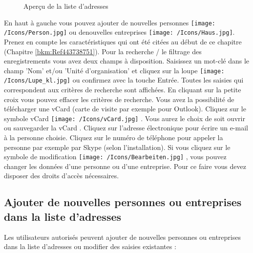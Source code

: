 \begin{figure}[H]
\caption{Aperçu de la liste d'adresses}
\end{figure}

En haut à gauche vous pouvez ajouter de nouvelles personnes \texttt{[image: /Icons/Person.jpg]} ou denouvelles entreprises \texttt{[image: /Icons/Haus.jpg]}. Prenez en compte les caractéristiques qui ont été citées au début de ce chapitre (Chapitre \ref{bkm:Ref443738751}). \newline
Pour la recherche / le filtrage des enregistrements vous avez deux champs à disposition. Saisissez un mot-clé dans le champ 'Nom' et/ou 'Unité d'organisation'  et cliquez sur la loupe \texttt{[image: /Icons/Lupe\_kl.jpg]}  ou confirmez avec la touche Entrée. Toutes les saisies qui correspondent aux critères de recherche sont affichées. En cliquant sur la petite croix  vous pouvez effacer les critères de recherche. \newline
Vous avez la possibilité de télécharger une vCard (carte de visite par exemple pour Outlook). Cliquez sur le symbole vCard \texttt{[image: /Icons/vCard.jpg]} . Vous aurez le choix de soit ouvrir ou sauvegarder la vCard .\newline
Cliquez sur l'adresse électronique  pour écrire un e-mail à la personne choisie. Cliquez sur le numéro de téléphone  pour appeler la personne par exemple par Skype (selon l'installation).\newline
Si vous cliquez sur le symbole de modification \texttt{[image: /Icons/Bearbeiten.jpg]} , vous pouvez changer les données d'une personne ou d'une entreprise. Pour ce faire vous devez disposer des droits d'accès nécessaires.

\subsection{Ajouter de nouvelles personnes ou entreprises dans la liste d'adresses}
Les utilisateurs autorisés peuvent ajouter de nouvelles personnes ou entreprises dans la liste d'adresses ou modifier des saisies existantes :

